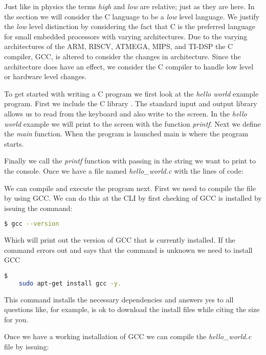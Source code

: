 Just like in physics the terms \emph{high} and \emph{low} are relative; just as they are here. In the section we will consider the C language to be a \emph{low} level language. We justify the \emph{low} level distinction by considering the fact that C is the preferred language for small embedded processors with varying architectures. Due to the varying architectures of the \ac{ARM}, \ac{RISCV}, \ac{ATMEGA}, \ac{MIPS}, and \ac{TI-DSP} the C compiler, \ac{GCC}, is altered to consider the changes in architecture. Since the architecture does have an effect, we consider the C compiler to handle low level or hardware level changes. 

To get started with writing a C program we first look at the \emph{hello world} example program. First we include the C library . The standard input and output library allows us to read from the keyboard and also write to the screen. In the \emph{hello world} example we will print to the screen with the function \emph{printf}. Next we define the \emph{main} function. When the program is launched main is where the program starts.

Finally we call the \emph{printf} function with passing in the string we want to print to the console. Once we have a file named \emph{hello\_world.c} with the lines of code:



We can compile and execute the program next. First we need to compile the file by using \ac{GCC}. We can do this at the \ac{CLI} by first checking of \ac{GCC} is installed by issuing the command: 
	
\begin{lstlisting}[language=bash]    
	$ gcc --version
\end{lstlisting}
	
Which will print out the version of \ac{GCC} that is currently installed. If the command errors out and says that the command is unknown we need to install \ac{GCC}	
	
\begin{lstlisting}[language=bash]$
	sudo apt-get install gcc -y.
\end{lstlisting}

This command installs the necessary dependencies and answers yes to all questions like, for example, is ok to download the install files while citing the size for you.

Once we have a working installation of \ac{GCC} we can compile the \emph{hello\_world.c} file by issuing:

